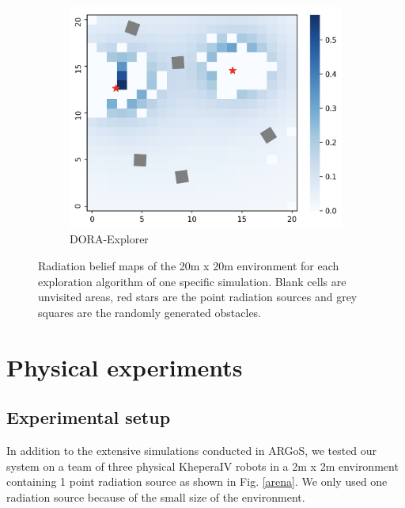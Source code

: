 \documentclass[letterpaper, 10 pt, conference]{ieeeconf}
\begin{document}
\begin{figure}
    \begin{subfigure}{0.32\textwidth}
        \includegraphics[width=\textwidth]{images/heatmap_dora.png}
        \caption{DORA-Explorer}
        \label{results:beliefdora}
    \end{subfigure}
    \caption{Radiation belief maps of the 20m x 20m environment for each exploration algorithm of one specific simulation. Blank cells are unvisited areas, red stars are the point radiation sources and grey squares are the randomly generated obstacles.}
    \label{results:belief}
\end{figure}


\section{Physical experiments}
\subsection{Experimental setup}
In addition to the extensive simulations conducted in ARGoS, we tested
our system on a team of three physical KheperaIV robots in a 2m x 2m
environment containing 1 point radiation source as shown in
Fig. \ref{arena}. We only used one radiation source because of the small size of the environment.
\end{document}
